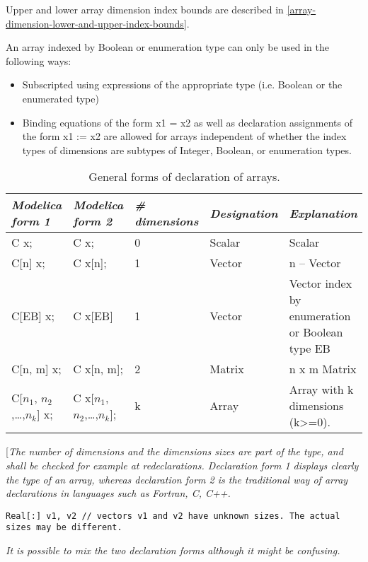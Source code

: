Upper and lower array dimension index bounds are described in \ref{array-dimension-lower-and-upper-index-bounds}.

An array indexed by Boolean or enumeration type can only be used in the
following ways:

\begin{itemize}
\item
  Subscripted using expressions of the appropriate type (i.e. Boolean or
  the enumerated type)
\item
  Binding equations of the form x1 = x2 as well as declaration
  assignments of the form x1 := x2 are allowed for arrays independent of
  whether the index types of dimensions are subtypes of Integer,
  Boolean, or enumeration types.
\end{itemize}

\begin{longtable}{|l|l|l|l|p{4cm}|}
\caption{General forms of declaration of arrays.}\\
\hline
\emph{Modelica form 1} & \emph{Modelica form 2} & \emph{\# dimensions} & \emph{Designation} & \emph{Explanation}\\ \hline
\endhead
C x; & C x; & 0 & Scalar & Scalar\\ \hline
C{[}n{]} x; & C x{[}n{]}; & 1 & Vector & n -- Vector\\ \hline
C{[}EB{]} x; & C x{[}EB{]} & 1 & Vector & Vector index by enumeration or
Boolean type EB\\ \hline
C{[}n, m{]} x; & C x{[}n, m{]}; & 2 & Matrix & n x m
Matrix\\ \hline
C{[}$n_1$, $n_{2}$,\ldots{},$n_k${]} x; & C x{[}$n_1$, $n_2$,\ldots{},$n_k${]}; & k & Array & Array with k dimensions
(k\textgreater{}=0).\\ \hline
\end{longtable}

{[}\emph{The number of dimensions and the dimensions sizes are part of
the type, and shall be checked for example at redeclarations.
Declaration form 1 displays clearly the type of an array, whereas
declaration form 2 is the traditional way of array declarations in
languages such as Fortran, C, C++.}

\begin{lstlisting}[language=modelica]
  Real[:] v1, v2 // vectors v1 and v2 have unknown sizes. The actual sizes may be different.
\end{lstlisting}

\emph{It is possible to mix the two declaration forms although it might
be confusing.}

